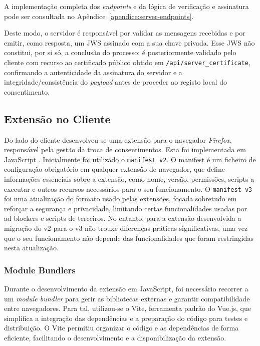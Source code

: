 A implementação completa dos \textit{endpoints} e da lógica de verificação e assinatura pode ser consultada no Apêndice~\ref{apendice:server-endpoints}.

Deste modo, o servidor é responsável por validar as mensagens recebidas e por emitir, como resposta, um JWS assinado com a sua chave privada. Esse JWS não constitui, por si só, a conclusão do processo: é posteriormente validado pelo cliente com recurso ao certificado público obtido em \texttt{/api/server\_certificate}, confirmando a autenticidade da assinatura do servidor e a integridade/consistência do \textit{payload} antes de proceder ao registo local do consentimento.

\subsection{Extensão no Cliente}
Do lado do cliente desenvolveu-se uma extensão para o navegador \textit{Firefox}, responsável pela gestão da troca de consentimentos. Esta foi implementada em JavaScript \citep{MozillaBrowserExtensions}. Inicialmente foi utilizado o \texttt{manifest v2}. O manifest é um ficheiro de configuração obrigatório em qualquer extensão de navegador, que define informações essenciais sobre a extensão, como nome, versão, permissões, scripts a executar e outros recursos necessários para o seu funcionamento. O \texttt{manifest v3} foi uma atualização do formato usado pelas extensões, focada sobretudo em reforçar a segurança e privacidade, limitando certas funcionalidades usadas por ad blockers e scripts de terceiros. No entanto, para a extensão desenvolvida a migração do v2 para o v3 não trouxe diferenças práticas significativas, uma vez que o seu funcionamento não depende das funcionalidades que foram restringidas nesta atualização.

\subsubsection{Module Bundlers}

Durante o desenvolvimento da extensão em JavaScript, foi necessário recorrer a um \textit{module bundler} para gerir as bibliotecas externas e garantir compatibilidade entre navegadores. Para tal, utilizou-se o Vite, ferramenta padrão do Vue.js, que simplifica a integração das dependências e a preparação do código para testes e distribuição. O Vite permitiu organizar o código e as dependências de forma eficiente, facilitando o desenvolvimento e a disponibilização da extensão.

